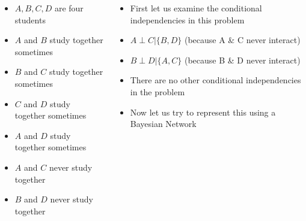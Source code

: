 \begin{frame}
	\begin{columns}
		\begin{overlayarea}{\textwidth}{\textheight}
		\vspace{0.1in}
		\begin{center}
		\end{center}
		\begin{itemize}\justifying
			\item<1-> $A,B,C,D$ are four students
			\item<1-> $A$ and $B$ study together sometimes
			\item<1-> $B$ and $C$ study together sometimes
			\item<1-> $C$ and $D$ study together sometimes
			\item<1-> $A$ and $D$ study together sometimes
			\item<1-> $A$ and $C$ never study together
			\item<1-> $B$ and $D$ never study together
		\end{itemize}
		\end{overlayarea}
		\begin{overlayarea}{\textwidth}{\textheight}
			\begin{itemize}\justifying
			\item<1-> First let us examine the conditional independencies in this problem
			\item<2-> $A \perp C | \{B,D\}$ (because A \& C never interact)
			\item<3-> $B \perp D | \{A,C\}$ (because B \& D never interact)
			\item<4-> There are no other conditional independencies in the problem
			\item<5-> Now let us try to represent this using a Bayesian Network
			\end{itemize}
		\end{overlayarea}
	\end{columns}
\end{frame}



